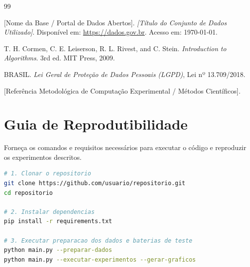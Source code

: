\documentclass[11pt,a4paper]{article}
\begin{document}
\begin{thebibliography}{99}

[Nome da Base / Portal de Dados Abertos]. 
\textit{[Título do Conjunto de Dados Utilizado]}. Disponível em: \url{https://dados.gov.br}. Acesso em: \today.

T. H. Cormen, C. E. Leiserson, R. L. Rivest, and C. Stein. 
\textit{Introduction to Algorithms}. 3rd ed. MIT Press, 2009.

BRASIL. 
\textit{Lei Geral de Proteção de Dados Pessoais (LGPD)}, Lei nº 13.709/2018.

[Referência Metodológica de Computação Experimental / Métodos Científicos].

\end{thebibliography}

\appendix
\section{Guia de Reprodutibilidade}

\begin{instrucao}
Forneça os comandos e requisitos necessários para executar o código e reproduzir os experimentos descritos.
\end{instrucao}

\begin{lstlisting}[language=bash, caption={Instruções de Execução dos Experimentos}]
# 1. Clonar o repositorio
git clone https://github.com/usuario/repositorio.git
cd repositorio

# 2. Instalar dependencias
pip install -r requirements.txt

# 3. Executar preparacao dos dados e baterias de teste
python main.py --preparar-dados
python main.py --executar-experimentos --gerar-graficos
\end{lstlisting}
\end{document}
